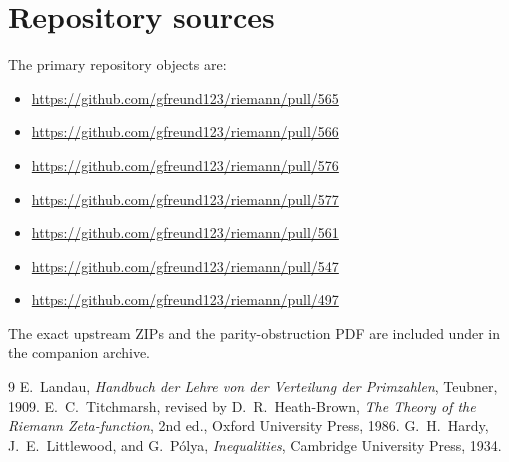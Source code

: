 \documentclass[11pt]{article}
\newcommand{\1}{\mathbf 1}
\begin{document}
\section{Repository sources}

The primary repository objects are:
\begin{itemize}
\item \url{https://github.com/gfreund123/riemann/pull/565}
\item \url{https://github.com/gfreund123/riemann/pull/566}
\item \url{https://github.com/gfreund123/riemann/pull/576}
\item \url{https://github.com/gfreund123/riemann/pull/577}
\item \url{https://github.com/gfreund123/riemann/pull/561}
\item \url{https://github.com/gfreund123/riemann/pull/547}
\item \url{https://github.com/gfreund123/riemann/pull/497}
\end{itemize}
The exact upstream ZIPs and the parity-obstruction PDF are included under  in the companion archive.

\begin{thebibliography}{9}
E.~Landau, \emph{Handbuch der Lehre von der Verteilung der Primzahlen}, Teubner, 1909.
E.~C.~Titchmarsh, revised by D.~R.~Heath-Brown, \emph{The Theory of the Riemann Zeta-function}, 2nd ed., Oxford University Press, 1986.
G.~H.~Hardy, J.~E.~Littlewood, and G.~P\'olya, \emph{Inequalities}, Cambridge University Press, 1934.
\end{thebibliography}
\end{document}
